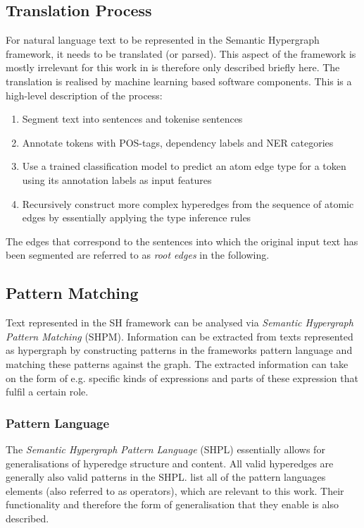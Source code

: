\documentclass[11pt]{scrreprt}
\begin{document}
\subsection{Translation Process}
For natural language text to be represented in the Semantic Hypergraph framework, it needs to be translated (or parsed). This aspect of the framework is mostly irrelevant for this work in is therefore only described briefly here. The translation is realised by machine learning based software components. This is a high-level description of the process: 

\begin{enumerate}
	\item Segment text into sentences and tokenise sentences
	\item Annotate tokens with POS-tags, dependency labels and NER categories
	\item Use a trained classification model to predict an atom edge type for a token using its annotation labels as input features
	\item Recursively construct more complex hyperedges from the sequence of atomic edges by essentially applying the type inference rules
\end{enumerate}

The edges that correspond to the sentences into which the original input text has been segmented are referred to as \textit{root edges} in the following. 


\subsection{Pattern Matching}
Text represented in the SH framework can be analysed via \textit{Semantic Hypergraph Pattern Matching} (SHPM). Information can be extracted from texts represented as hypergraph by constructing patterns in the frameworks pattern language and matching these patterns against the graph. The extracted information can take on the form of e.g. specific kinds of expressions and parts of these expression that fulfil a certain role.


\subsubsection{Pattern Language}
\label{sec:sh-pattern-language}
The \textit{Semantic Hypergraph Pattern Language} (SHPL) essentially allows for generalisations of hyperedge structure and content. All valid hyperedges are generally also valid patterns in the SHPL.  list all of the pattern languages elements (also referred to as operators), which are relevant to this work. Their functionality and therefore the form of generalisation that they enable is also described.
\end{document}
